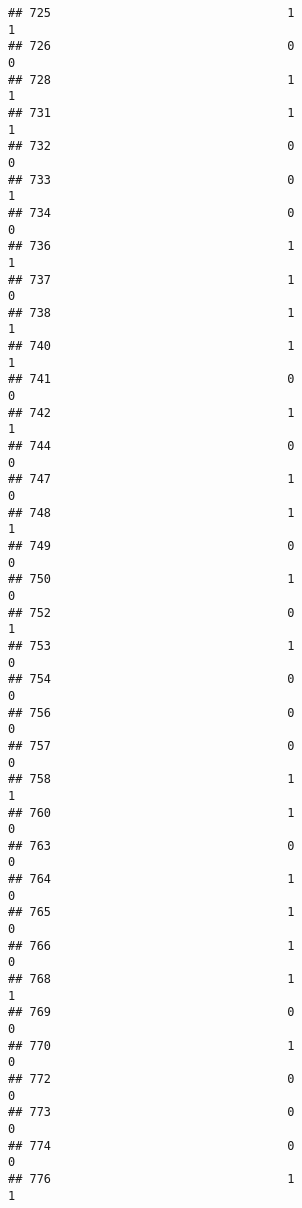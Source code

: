 \documentclass[
]{article}
\begin{document}
\begin{verbatim}
## 725                                 1                                1
## 726                                 0                                0
## 728                                 1                                1
## 731                                 1                                1
## 732                                 0                                0
## 733                                 0                                1
## 734                                 0                                0
## 736                                 1                                1
## 737                                 1                                0
## 738                                 1                                1
## 740                                 1                                1
## 741                                 0                                0
## 742                                 1                                1
## 744                                 0                                0
## 747                                 1                                0
## 748                                 1                                1
## 749                                 0                                0
## 750                                 1                                0
## 752                                 0                                1
## 753                                 1                                0
## 754                                 0                                0
## 756                                 0                                0
## 757                                 0                                0
## 758                                 1                                1
## 760                                 1                                0
## 763                                 0                                0
## 764                                 1                                0
## 765                                 1                                0
## 766                                 1                                0
## 768                                 1                                1
## 769                                 0                                0
## 770                                 1                                0
## 772                                 0                                0
## 773                                 0                                0
## 774                                 0                                0
## 776                                 1                                1

\end{verbatim}
\end{document}
